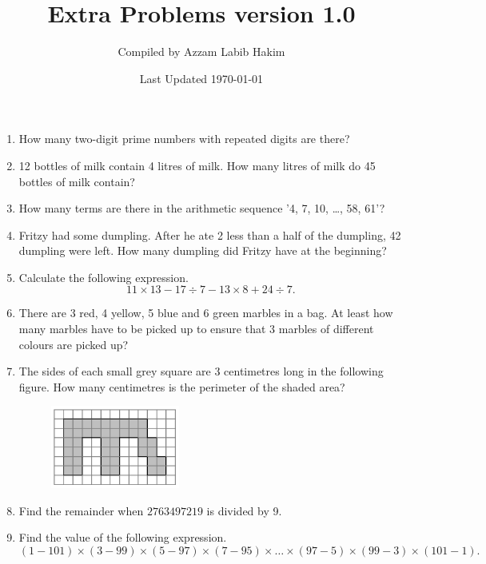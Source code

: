 \documentclass[11pt]{scrartcl}
\title{Extra Problems version 1.0}
\author{Compiled by Azzam Labib Hakim}
\date{Last Updated \today}
\begin{document}
\maketitle

\begin{enumerate}
    \item How many two-digit prime numbers with repeated digits are there?

    \item  12 bottles of milk contain 4 litres of milk. How many litres of milk do 45 bottles of milk contain?

    

    \item  How many terms are there in the arithmetic sequence '4, 7, 10, \ldots, 58, 61'?

    \item  Fritzy had some dumpling. After he ate 2 less than a half of the dumpling, 42 dumpling were left. How many dumpling did Fritzy have at the beginning?

    

    \item  Calculate the following expression.
    $$11 \times 13 - 17 \div 7 - 13 \times 8 +24 \div 7.$$

    \item  There are 3 red, 4 yellow, 5 blue and 6 green marbles in a bag. At least how many marbles have to be picked up to ensure that 3 marbles of different colours are picked up?

    

    \item  The sides of each small grey square are 3 centimetres long in the following figure. How many centimetres is the perimeter of the shaded area?
    \begin{figure}[h]
        \centering
        \includegraphics[width=0.4\textwidth]{StarGen/0Figure/perimeter-weird.png}
    \end{figure}

    \item  Find the remainder when $2763497219$ is divided by 9.


    \item Find the value of the following expression.
    $$(1-101) \times (3-99) \times (5-97) \times (7-95) \times \ldots \times (97-5) \times (99-3) \times (101-1).$$
    

\end{enumerate}
\end{document}
